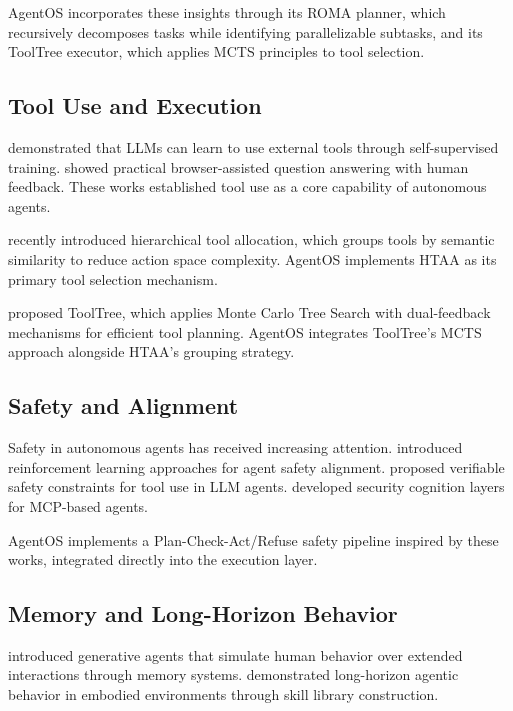 \documentclass{article}
\begin{document}
AgentOS incorporates these insights through its ROMA planner, which recursively decomposes tasks while identifying parallelizable subtasks, and its ToolTree executor, which applies MCTS principles to tool selection.

\subsection{Tool Use and Execution}

\citet{schick2023toolformer} demonstrated that LLMs can learn to use external tools through self-supervised training. \citet{nakano2021webgpt} showed practical browser-assisted question answering with human feedback. These works established tool use as a core capability of autonomous agents.

\citet{htaa2026} recently introduced hierarchical tool allocation, which groups tools by semantic similarity to reduce action space complexity. AgentOS implements HTAA as its primary tool selection mechanism.

\citet{yang2026tooltree} proposed ToolTree, which applies Monte Carlo Tree Search with dual-feedback mechanisms for efficient tool planning. AgentOS integrates ToolTree's MCTS approach alongside HTAA's grouping strategy.

\subsection{Safety and Alignment}

Safety in autonomous agents has received increasing attention. \citet{sha2025safety} introduced reinforcement learning approaches for agent safety alignment. \citet{doshi2026safe} proposed verifiable safety constraints for tool use in LLM agents. \citet{mcpshield2026} developed security cognition layers for MCP-based agents.

AgentOS implements a Plan-Check-Act/Refuse safety pipeline inspired by these works, integrated directly into the execution layer.

\subsection{Memory and Long-Horizon Behavior}

\citet{park2023generative} introduced generative agents that simulate human behavior over extended interactions through memory systems. \citet{wang2023voyager} demonstrated long-horizon agentic behavior in embodied environments through skill library construction.
\end{document}
